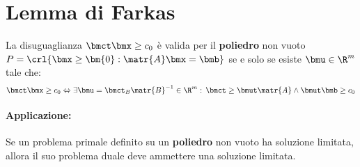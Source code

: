 \documentclass[\main/main.tex]{subfiles}
\begin{document}
\section{Lemma di Farkas}

\begin{theorem}
  \label{lemma_farkas}
  La disuguaglianza $\bmct\bmx \geq c_0$ è valida per il \textbf{poliedro} non vuoto $P=\crl{\bmx\geq\bm{0}:\matr{A}\bmx=\bmb}$ se e solo se esiste $\bmu \in \R^m$ tale che:
  \[
    \bmct \bmx \geq c_0 \Leftrightarrow \exists \bmu = \bmct_B \matr{B}^{-1} \in \R^m:\, \bmct \geq \bmut \matr{A} \land \bmut \bmb \geq c_0
  \]
  \paragraph*{Applicazione:} Se un problema primale definito su un \textbf{poliedro} non vuoto ha soluzione limitata, allora il suo problema duale deve ammettere una soluzione limitata.
\end{theorem}
\end{document}

